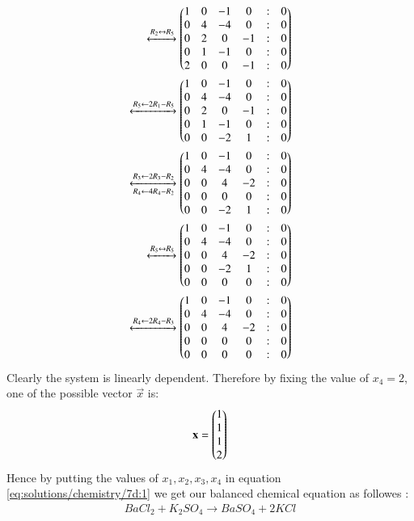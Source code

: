 \begin{align}
\xleftrightarrow{R_2 \leftrightarrow R_5}\begin{pmatrix}1&0&-1&0&:&0\\0&4&-4&0&:&0\\0&2&0&-1&:&0\\0&1&-1&0&:&0\\2&0&0&-1&:&0\end{pmatrix}\\
\xleftrightarrow{R_5 \leftarrow 2R_1-R_5}\begin{pmatrix}1&0&-1&0&:&0\\0&4&-4&0&:&0\\0&2&0&-1&:&0\\0&1&-1&0&:&0\\0&0&-2&1&:&0\end{pmatrix}\\
\xleftrightarrow[R_4 \leftarrow 4R_4-R_2]{R_3 \leftarrow 2R_3-R_2}\begin{pmatrix}1&0&-1&0&:&0\\0&4&-4&0&:&0\\0&0&4&-2&:&0\\0&0&0&0&:&0\\0&0&-2&1&:&0\end{pmatrix}\\
\xleftrightarrow{R_5 \leftrightarrow R_5}\begin{pmatrix}1&0&-1&0&:&0\\0&4&-4&0&:&0\\0&0&4&-2&:&0\\0&0&-2&1&:&0\\0&0&0&0&:&0\end{pmatrix}\\
\xleftrightarrow{R_4 \leftarrow 2R_4-R_3}\begin{pmatrix}1&0&-1&0&:&0\\0&4&-4&0&:&0\\0&0&4&-2&:&0\\0&0&0&0&:&0\\0&0&0&0&:&0\end{pmatrix}
\end{align}
Clearly the system is linearly dependent. Therefore by fixing the value of $x_4=2$, one of the possible vector $\vec{x}$ is:
\begin{align}
    \mathbf{x}=\begin{pmatrix}1\\1\\1\\2\end{pmatrix}
\end{align}
Hence by putting the values of $x_1,x_2,x_3,x_4$ in equation \eqref{eq:solutions/chemistry/7d:1} we get our balanced chemical equation as followes :
\begin{align}
BaCl_2 + K_2SO_4 \rightarrow BaSO_4 + 2KCl
\end{align}


